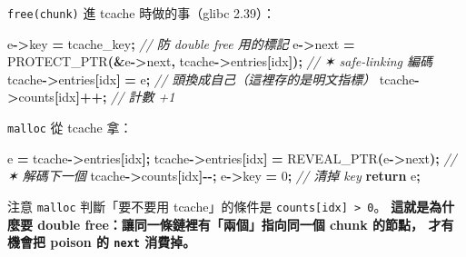 \documentclass[10pt,a4paper]{article}
\newenvironment{Shaded}{\begin{snugshade}}{\end{snugshade}}
\newcommand{\CommentTok}[1]{\textcolor[rgb]{0.56,0.35,0.01}{\textit{#1}}}
\newcommand{\ControlFlowTok}[1]{\textcolor[rgb]{0.13,0.29,0.53}{\textbf{#1}}}
\newcommand{\DecValTok}[1]{\textcolor[rgb]{0.00,0.00,0.81}{#1}}
\newcommand{\NormalTok}[1]{#1}
\newcommand{\OperatorTok}[1]{\textcolor[rgb]{0.81,0.36,0.00}{\textbf{#1}}}
\renewenvironment{Shaded}{%
  \def\FrameCommand{\fboxsep=3.2pt\colorbox{shadecolor}}%
  \MakeFramed{\advance\hsize-\width\FrameRestore\small}%
}{%
  \endMakeFramed
}
\renewenvironment{quote}{%
  \begin{mdframed}[linewidth=0pt,innerleftmargin=0pt,innerrightmargin=0pt,
    innerbottommargin=0pt,innertopmargin=0pt,skipabove=0.55em,skipbelow=0.55em,
    leftmargin=0.9em,rightmargin=0.4em,startcode={\color{quotebar}\vrule width 2.6pt},%
    endcode={}]%
  \itshape\color{black}%
}{%
  \end{mdframed}%
}
\begin{document}
\texttt{free(chunk)} 進 tcache 時做的事（glibc 2.39）：

\begin{Shaded}
\begin{Highlighting}[]
\NormalTok{e}\OperatorTok{{-}\textgreater{}}\NormalTok{key  }\OperatorTok{=}\NormalTok{ tcache\_key}\OperatorTok{;}                                  \CommentTok{// 防 double free 用的標記}
\NormalTok{e}\OperatorTok{{-}\textgreater{}}\NormalTok{next }\OperatorTok{=}\NormalTok{ PROTECT\_PTR}\OperatorTok{(\&}\NormalTok{e}\OperatorTok{{-}\textgreater{}}\NormalTok{next}\OperatorTok{,}\NormalTok{ tcache}\OperatorTok{{-}\textgreater{}}\NormalTok{entries}\OperatorTok{[}\NormalTok{idx}\OperatorTok{]);} \CommentTok{// ✶ safe{-}linking 編碼}
\NormalTok{tcache}\OperatorTok{{-}\textgreater{}}\NormalTok{entries}\OperatorTok{[}\NormalTok{idx}\OperatorTok{]} \OperatorTok{=}\NormalTok{ e}\OperatorTok{;}                              \CommentTok{// 頭換成自己（這裡存的是明文指標）}
\NormalTok{tcache}\OperatorTok{{-}\textgreater{}}\NormalTok{counts}\OperatorTok{[}\NormalTok{idx}\OperatorTok{]++;}                                 \CommentTok{// 計數 +1}
\end{Highlighting}
\end{Shaded}

\texttt{malloc} 從 tcache 拿：

\begin{Shaded}
\begin{Highlighting}[]
\NormalTok{e }\OperatorTok{=}\NormalTok{ tcache}\OperatorTok{{-}\textgreater{}}\NormalTok{entries}\OperatorTok{[}\NormalTok{idx}\OperatorTok{];}
\NormalTok{tcache}\OperatorTok{{-}\textgreater{}}\NormalTok{entries}\OperatorTok{[}\NormalTok{idx}\OperatorTok{]} \OperatorTok{=}\NormalTok{ REVEAL\_PTR}\OperatorTok{(}\NormalTok{e}\OperatorTok{{-}\textgreater{}}\NormalTok{next}\OperatorTok{);}   \CommentTok{// ✶ 解碼下一個}
\NormalTok{tcache}\OperatorTok{{-}\textgreater{}}\NormalTok{counts}\OperatorTok{[}\NormalTok{idx}\OperatorTok{]{-}{-};}
\NormalTok{e}\OperatorTok{{-}\textgreater{}}\NormalTok{key }\OperatorTok{=} \DecValTok{0}\OperatorTok{;}                                   \CommentTok{// 清掉 key}
\ControlFlowTok{return}\NormalTok{ e}\OperatorTok{;}
\end{Highlighting}
\end{Shaded}

\begin{quote}
注意 \texttt{malloc} 判斷「要不要用 tcache」的條件是
\texttt{counts{[}idx{]}\ \allowbreak{}\textgreater{}\allowbreak{}\ \allowbreak{}0}。 \textbf{這就是為什麼要
double free：讓同一條鏈裡有「兩個」指向同一個 chunk 的節點， 才有機會把
poison 的 \texttt{next} 消費掉。}
\end{quote}
\end{document}
